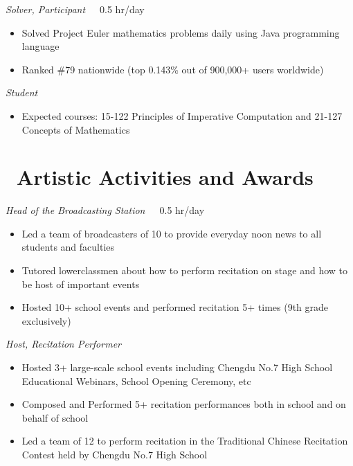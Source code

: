 \documentclass{resume}
\begin{document}
\emph{Solver, Participant}\ \ \ 0.5 hr/day
\begin{itemize}
  \item Solved Project Euler mathematics problems daily using Java programming language
  \item Ranked \#79 nationwide (top 0.143\% out of 900,000+ users worldwide)
\end{itemize}

\emph{Student}
\begin{itemize}
  \item Expected courses: 15-122 Principles of Imperative Computation and 21-127 Concepts of Mathematics
\end{itemize}


\section{\faHeartO\ Artistic Activities and Awards}
\emph{Head of the Broadcasting Station}\ \ \ 0.5 hr/day
\begin{itemize}
  \item Led a team of broadcasters of 10 to provide everyday noon news to all students and faculties 
  \item Tutored lowerclassmen about how to perform recitation on stage and how to be host of important events
  \item Hosted 10+ school events and performed recitation 5+ times (9th grade exclusively)
\end{itemize}

\emph{Host, Recitation Performer}
\begin{itemize}
  \item Hosted 3+ large-scale school events including Chengdu No.7 High School Educational Webinars, School Opening Ceremony, etc
  \item Composed and Performed 5+ recitation performances both in school and on behalf of school
  \item Led a team of 12 to perform recitation in the Traditional Chinese Recitation Contest held by Chengdu No.7 High School
\end{itemize}
\end{document}
